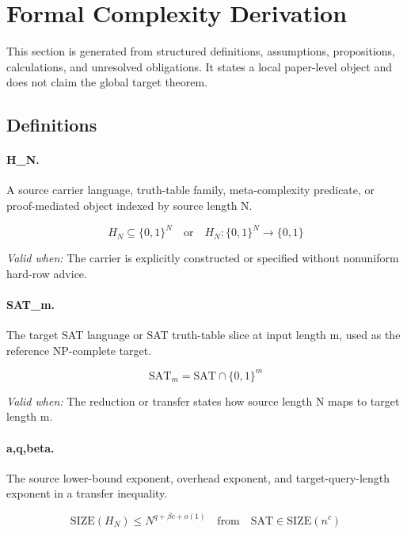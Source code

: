 %
%
%
\section{Formal Complexity Derivation}

\label{sec:formal-derivation}

This section is generated from structured definitions, assumptions, propositions, calculations, and unresolved obligations. It states a local paper-level object and does not claim the global target theorem.

\subsection{Definitions}

\paragraph{H\_N.} A source carrier language, truth-table family, meta-complexity predicate, or proof-mediated object indexed by source length N.

\[
H_N\subseteq\{0,1\}^{N}\quad\text{or}\quad H_N:\{0,1\}^{N}\to\{0,1\}
\]

\emph{Valid when:} The carrier is explicitly constructed or specified without nonuniform hard-row advice.

\paragraph{SAT\_m.} The target SAT language or SAT truth-table slice at input length m, used as the reference NP-complete target.

\[
\mathrm{SAT}_m=\mathrm{SAT}\cap\{0,1\}^m
\]

\emph{Valid when:} The reduction or transfer states how source length N maps to target length m.

\paragraph{a,q,beta.} The source lower-bound exponent, overhead exponent, and target-query-length exponent in a transfer inequality.

\[
\mathrm{SIZE}(H_N)\le N^{q+\beta c+o(1)}\quad\text{from}\quad \mathrm{SAT}\in\mathrm{SIZE}(n^c)
\]


